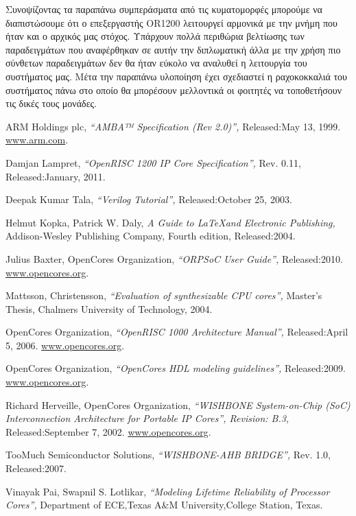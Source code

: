 \documentclass[a4paper,10pt]{article}
\numberwithin{figure}{section}
\numberwithin{table}{section}
\begin{document}
\vspace{1.7cm}
Συνοψίζοντας τα παραπάνω συμπεράσματα από τις κυματομορφές μπορούμε να διαπιστώσουμε ότι ο επεξεργαστής OR1200 λειτουργεί αρμονικά με την μνήμη που ήταν και ο αρχικός μας στόχος. Υπάρχουν πολλά περιθώρια βελτίωσης των παραδειγμάτων που αναφέρθηκαν σε αυτήν την διπλωματική άλλα με την χρήση πιο σύνθετων παραδειγμάτων δεν θα ήταν εύκολο να αναλυθεί η λειτουργία του συστήματος μας. Μέτα την παραπάνω υλοποίηση έχει σχεδιαστεί η ραχοκοκκαλιά του συστήματος πάνω στο οποίο θα μπορέσουν μελλοντικά οι φοιτητές να τοποθετήσουν τις δικές τους μονάδες.

\newpage
\vspace{0.7cm}
\newpage
\begin{thebibliography}{9}

  ARM Holdings plc, \emph{ “AMBA™ Specification (Rev 2.0)”,}
Released:May 13, 1999.  \url{www.arm.com}.

Damjan Lampret, \emph{“OpenRISC 1200 IP Core Specification”,} Rev. 0.11,
Released:January, 2011. 

  Deepak Kumar Tala, \emph{ “Verilog Tutorial”,}
Released:October 25, 2003. 

 Helmut Kopka, Patrick W. Daly, \emph{A Guide to \LaTeX  and Electronic Publishing,}
  Addison-Wesley Publishing Company,
  Fourth edition,
  Released:2004.

Julius Baxter, OpenCores Organization, \emph{ “ORPSoC User Guide”,}
Released:2010.  \url{www.opencores.org}.

Mattsson, Christensson, \emph{ “Evaluation of synthesizable CPU cores”,}
Master’s Thesis, Chalmers University of Technology, 2004.

  OpenCores Organization, \emph{“OpenRISC 1000 Architecture Manual”,}
Released:April 5, 2006.  \url{www.opencores.org}.

  OpenCores Organization, \emph{“OpenCores HDL modeling guidelines”,}
Released:2009.  \url{www.opencores.org}.

  Richard Herveille, OpenCores Organization, \emph{ “WISHBONE System-on-Chip (SoC) Interconnection
Architecture for Portable IP Cores”, Revision: B.3,}
Released:September 7, 2002.  \url{www.opencores.org}.

  TooMuch Semiconductor Solutions, \emph{“WISHBONE-AHB BRIDGE”,} Rev. 1.0,
Released:2007. 

  Vinayak Pai, Swapnil S. Lotlikar, \emph{“Modeling Lifetime Reliability of Processor Cores”,}
Department of ECE,Texas A\&M University,College Station, Texas.

\end{thebibliography}
\end{document}
